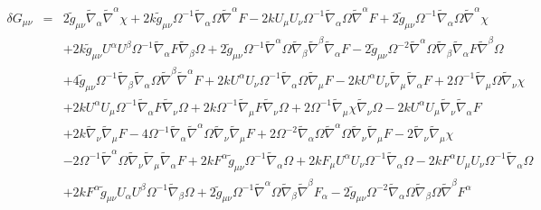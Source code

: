 \documentclass[10pt,letterpaper]{article}
\numberwithin{equation}{section}
\begin{document}
\begin{eqnarray}
\delta G_{\mu\nu}&=& 2 \tilde{g}_{\mu \nu } \tilde{\nabla}_{\alpha }\tilde{\nabla}^{\alpha }\chi + 2 k \tilde{g}_{\mu \nu } \Omega^{-1} \tilde{\nabla}_{\alpha }\Omega \tilde{\nabla}^{\alpha }F - 2 k U_{\mu } U_{\nu } \Omega^{-1} \tilde{\nabla}_{\alpha }\Omega \tilde{\nabla}^{\alpha }F + 2 \tilde{g}_{\mu \nu } \Omega^{-1} \tilde{\nabla}_{\alpha }\Omega \tilde{\nabla}^{\alpha }\chi \nonumber \\ 
&& + 2 k \tilde{g}_{\mu \nu } U^{\alpha } U^{\beta } \Omega^{-1} \tilde{\nabla}_{\alpha }F \tilde{\nabla}_{\beta }\Omega + 2 \tilde{g}_{\mu \nu } \Omega^{-1} \tilde{\nabla}^{\alpha }\Omega \tilde{\nabla}_{\beta }\tilde{\nabla}^{\beta }\tilde{\nabla}_{\alpha }F - 2 \tilde{g}_{\mu \nu } \Omega^{-2} \tilde{\nabla}^{\alpha }\Omega \tilde{\nabla}_{\beta }\tilde{\nabla}_{\alpha }F \tilde{\nabla}^{\beta }\Omega \nonumber \\ 
&& + 4 \tilde{g}_{\mu \nu } \Omega^{-1} \tilde{\nabla}_{\beta }\tilde{\nabla}_{\alpha }\Omega \tilde{\nabla}^{\beta }\tilde{\nabla}^{\alpha }F + 2 k U^{\alpha } U_{\nu } \Omega^{-1} \tilde{\nabla}_{\alpha }\Omega \tilde{\nabla}_{\mu }F - 2 k U^{\alpha } U_{\nu } \tilde{\nabla}_{\mu }\tilde{\nabla}_{\alpha }F + 2 \Omega^{-1} \tilde{\nabla}_{\mu }\Omega \tilde{\nabla}_{\nu }\chi \nonumber \\ 
&& + 2 k U^{\alpha } U_{\mu } \Omega^{-1} \tilde{\nabla}_{\alpha }F \tilde{\nabla}_{\nu }\Omega + 2 k \Omega^{-1} \tilde{\nabla}_{\mu }F \tilde{\nabla}_{\nu }\Omega + 2 \Omega^{-1} \tilde{\nabla}_{\mu }\chi \tilde{\nabla}_{\nu }\Omega - 2 k U^{\alpha } U_{\mu } \tilde{\nabla}_{\nu }\tilde{\nabla}_{\alpha }F \nonumber \\ 
&& + 2 k \tilde{\nabla}_{\nu }\tilde{\nabla}_{\mu }F - 4 \Omega^{-1} \tilde{\nabla}_{\alpha }\tilde{\nabla}^{\alpha }\Omega \tilde{\nabla}_{\nu }\tilde{\nabla}_{\mu }F + 2 \Omega^{-2} \tilde{\nabla}_{\alpha }\Omega \tilde{\nabla}^{\alpha }\Omega \tilde{\nabla}_{\nu }\tilde{\nabla}_{\mu }F - 2 \tilde{\nabla}_{\nu }\tilde{\nabla}_{\mu }\chi \nonumber \\ 
&& - 2 \Omega^{-1} \tilde{\nabla}^{\alpha }\Omega \tilde{\nabla}_{\nu }\tilde{\nabla}_{\mu }\tilde{\nabla}_{\alpha }F+2 k F^{\alpha } \tilde{g}_{\mu \nu } \Omega^{-1} \tilde{\nabla}_{\alpha }\Omega + 2 k F_{\mu } U^{\alpha } U_{\nu } \Omega^{-1} \tilde{\nabla}_{\alpha }\Omega - 2 k F^{\alpha } U_{\mu } U_{\nu } \Omega^{-1} \tilde{\nabla}_{\alpha }\Omega \nonumber \\ 
&& + 2 k F^{\alpha } \tilde{g}_{\mu \nu } U_{\alpha } U^{\beta } \Omega^{-1} \tilde{\nabla}_{\beta }\Omega + 2 \tilde{g}_{\mu \nu } \Omega^{-1} \tilde{\nabla}^{\alpha }\Omega \tilde{\nabla}_{\beta }\tilde{\nabla}^{\beta }F_{\alpha } - 2 \tilde{g}_{\mu \nu } \Omega^{-2} \tilde{\nabla}_{\alpha }\Omega \tilde{\nabla}_{\beta }\Omega \tilde{\nabla}^{\beta }F^{\alpha } \nonumber \\ 

\end{eqnarray}
\end{document}

